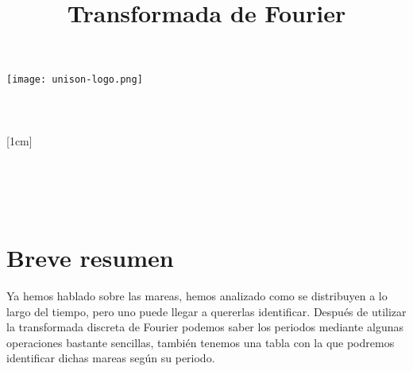 \documentclass[a4paper,12pt]{article}
\title{Transformada de Fourier}
\author{}
\newcommand{\vacio}{\textcolor{white}{holacaracola}}
\newcommand{\director}{Carlos Lizárraga Celaya}
\begin{document}
\begin{titlepage}
\begin{center}
\vspace{1cm}

\texttt{[image: unison-logo.png]}
\\[0.5cm]
{\fontsize{24}{6}\selectfont{UNIVERSIDAD DE SONORA}}\\
[1em]
{\fontsize{16}{5}\selectfont{DEPARTAMENTO DE FÍSICA}}\\
[4em]
\textcolor{azulportada}
{\fontsize{30}{5}\selectfont{\textsc{\thetitle}}}\\
[1cm]
{\fontsize{16}{5}\selectfont{Alumno:}}\\
[0.2cm]
{\fontsize{14}{5}\selectfont{Luis Alfonso Torres Flores}}\\
[1cm]
{\fontsize{16}{5}\selectfont{Profesor}}\\
[0.2cm]
{\fontsize{16}{5}\selectfont{\director}}\\
[4.5cm]
{\fontsize{14}{5}\selectfont{18 de Abril de 2017}}\\
[4cm]
\end{center}
\restoregeometry
\end{titlepage}

\newpage
\renewcommand{\headrulewidth}{0.5pt}
\fancyhead[L]{\vacio}

\newpage
\tableofcontents
\newpage
\section{Breve resumen}
\noindent
Ya hemos hablado sobre las mareas, hemos analizado como se distribuyen a lo largo del tiempo, pero uno puede llegar a quererlas identificar. Después de utilizar la transformada discreta de Fourier podemos saber los periodos mediante algunas operaciones bastante sencillas, también tenemos una tabla con la que podremos identificar dichas mareas según su periodo.
\end{document}
